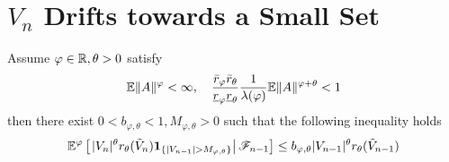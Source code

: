 \documentclass[aoas,preprint]{imsart}
\numberwithin{equation}{section}
\theoremstyle{plain}
\begin{document}
\section[The Chain Drifts towards a Small Set]{$V_n$ Drifts towards a Small Set}
\label{sec:drift}
\begin{lemma}
  \label{lemma:1}
  Assume $\varphi \in \mathbb R, \theta > 0$ satisfy
  \begin{equation}
    \label{eq:drift_cond}
    \mathbb{E} \|A\|^\varphi < \infty,\quad
       {
         \bar r_\varphi  \bar r_\theta
         \over
         \underline r_\varphi \underline r_\theta
       } {1 \over \lambda(\varphi)}
       \mathbb{E} \| A \|^{\varphi + \theta}
       < 1
  \end{equation}
  then there exist
  $0 < b_{\varphi, \theta} < 1, M_{\varphi, \theta} > 0$
  such that the following inequality holds
  \begin{equation}
    \label{eq:drift}
    \mathbb{E}^\varphi \left[\left.
      |V_n|^\theta r_\theta(\tilde V_n)
      \mathbf{1}_{\{|V_{n-1}| > M_{\varphi, \theta}\}} \right|
      \mathscr F_{n-1} \right]
    \leq
    b_{\varphi, \theta} |V_{n-1}|^\theta
    r_{\theta}(\tilde V_{n-1})
  \end{equation}
\end{lemma}
\end{document}

